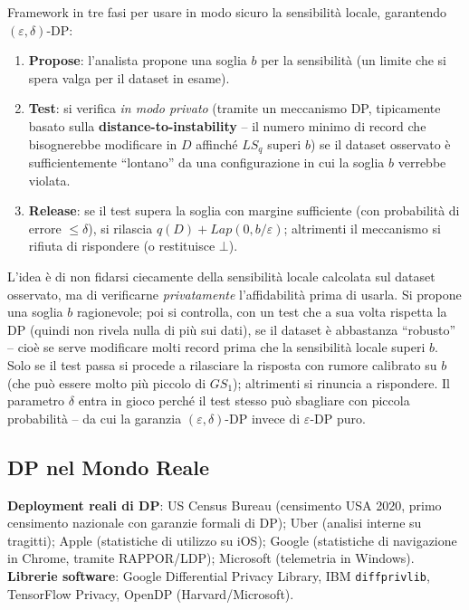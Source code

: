 \documentclass[a4paper,11pt]{article}
\begin{document}
\begin{definizione}
Framework in tre fasi per usare in modo sicuro la sensibilit\`{a} locale, garantendo $(\varepsilon,\delta)$-DP:
\begin{enumerate}
  \item \textbf{Propose}: l'analista propone una soglia $b$ per la sensibilit\`{a} (un limite che si spera valga per il dataset in esame).
  \item \textbf{Test}: si verifica \emph{in modo privato} (tramite un meccanismo DP, tipicamente basato sulla \textbf{distance-to-instability} -- il numero minimo di record che bisognerebbe modificare in $D$ affinch\'{e} $LS_q$ superi $b$) se il dataset osservato \`{e} sufficientemente ``lontano'' da una configurazione in cui la soglia $b$ verrebbe violata.
  \item \textbf{Release}: se il test supera la soglia con margine sufficiente (con probabilit\`{a} di errore $\leq \delta$), si rilascia $q(D) + Lap(0, b/\varepsilon)$; altrimenti il meccanismo si rifiuta di rispondere (o restituisce $\bot$).
\end{enumerate}
\end{definizione}

\begin{nota}
L'idea \`{e} di non fidarsi ciecamente della sensibilit\`{a} locale calcolata sul dataset osservato, ma di verificarne \emph{privatamente} l'affidabilit\`{a} prima di usarla. Si propone una soglia $b$ ragionevole; poi si controlla, con un test che a sua volta rispetta la DP (quindi non rivela nulla di pi\`{u} sui dati), se il dataset \`{e} abbastanza ``robusto'' -- cio\`{e} se serve modificare molti record prima che la sensibilit\`{a} locale superi $b$. Solo se il test passa si procede a rilasciare la risposta con rumore calibrato su $b$ (che pu\`{o} essere molto pi\`{u} piccolo di $GS_1$); altrimenti si rinuncia a rispondere. Il parametro $\delta$ entra in gioco perch\'{e} il test stesso pu\`{o} sbagliare con piccola probabilit\`{a} -- da cui la garanzia $(\varepsilon,\delta)$-DP invece di $\varepsilon$-DP puro.
\end{nota}

\subsection{DP nel Mondo Reale}

\textbf{Deployment reali di DP}: US Census Bureau (censimento USA 2020, primo censimento nazionale con garanzie formali di DP); Uber (analisi interne su tragitti); Apple (statistiche di utilizzo su iOS); Google (statistiche di navigazione in Chrome, tramite RAPPOR/LDP); Microsoft (telemetria in Windows). \textbf{Librerie software}: Google Differential Privacy Library, IBM \texttt{diffprivlib}, TensorFlow Privacy, OpenDP (Harvard/Microsoft).
\end{document}
